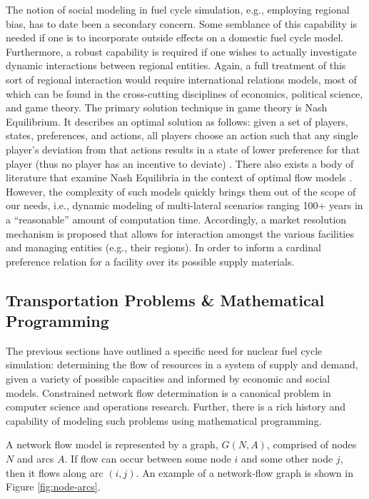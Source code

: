 The notion of social modeling in fuel cycle simulation, e.g., employing regional
bias, has to date been a secondary concern. Some semblance of this capability is
needed if one is to incorporate outside effects on a domestic fuel cycle
model. Furthermore, a robust capability is required if one wishes to actually
investigate dynamic interactions between regional entities. Again, a full
treatment of this sort of regional interaction would require international
relations models, most of which can be found in the cross-cutting disciplines of
economics, political science, and game theory. The primary solution technique in
game theory is Nash Equilibrium. It describes an optimal solution as follows:
given a set of players, states, preferences, and actions, all players choose an
action such that any single player's deviation from that actions results in a
state of lower preference for that player (thus no player has an incentive to
deviate) \cite{mccarty_political_2007}. There also exists a body of literature
that examine Nash Equilibria in the context of optimal flow models
\cite{mazumdar_fairness_1991,nagurney_supply_2002,song_nash_2002}. However, the
complexity of such models quickly brings them out of the scope of our needs,
i.e., dynamic modeling of multi-lateral scenarios ranging 100+ years in a
``reasonable'' amount of computation time. Accordingly, a market resolution
mechanism is proposed that allows for interaction amongst the various facilities
and managing entities (e.g., their regions). In order to inform a cardinal
preference \cite{strotz_cardinal_1953} relation for a facility over its possible
supply materials.

\subsection{Transportation Problems \& Mathematical Programming}\label{intro:prog}

The previous sections have outlined a specific need for nuclear fuel cycle
simulation: determining the flow of resources in a system of supply and demand,
given a variety of possible capacities and informed by economic and social
models. Constrained network flow determination is a canonical problem in
computer science and operations research. Further, there is a rich history and
capability of modeling such problems using mathematical programming.

A network flow model is represented by a graph, $G(N, A)$, comprised of nodes
$N$ and arcs $A$. If flow can occur between some node $i$ and some other node
$j$, then it flows along arc $(i, j)$. An example of a network-flow graph is
shown in Figure \ref{fig:node-arcs}.

